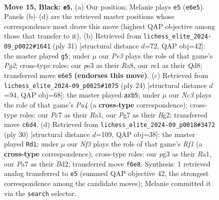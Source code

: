 \documentclass[11pt]{article}
\begin{document}
\begin{figure}[p]
\label{fig:thought-m27}
\end{figure}

\clearpage

\begin{figure}[p]\centering
\begin{subfigure}{0.46\textwidth}\centering
\resizebox{\linewidth}{!}{%
\newchessgame
\chessboard[
  setfen={1rbr2k1/p1p1qpp1/2n1pn2/2Pp3p/1p1P4/1Q2PNP1/PP1B1P1P/2K1RB1R b - - 1 15},
  showmover=false,
  pgfstyle=straightmove, color=movearrow, markmove={e6-e5}
]}
\caption{}
\end{subfigure}\hfill
\begin{subfigure}{0.46\textwidth}\centering
\resizebox{\linewidth}{!}{%
\newchessgame
\chessboard[
  setfen={r2qr1k1/1p1b1pp1/2pp1n1p/p4n2/P1P1pN2/1PP1P1PP/5PB1/R1BQ1RK1 b - - 1 16},
  showmover=false,
  pgfstyle=straightmove, color=movearrow, markmove={g7-g5}
]}
\caption{}
\end{subfigure}
\\[4pt]
\begin{subfigure}{0.46\textwidth}\centering
\resizebox{\linewidth}{!}{%
\newchessgame
\chessboard[
  setfen={1rbq1rk1/2p2pp1/p1n1pb1p/1p6/P1pP4/2N2NP1/1PQ1PPBP/R2R2K1 w - - 0 13},
  showmover=false,
  pgfstyle=straightmove, color=movearrow, markmove={a4-b5}
]}
\caption{}
\end{subfigure}\hfill
\begin{subfigure}{0.46\textwidth}\centering
\resizebox{\linewidth}{!}{%
\newchessgame
\chessboard[
  setfen={rn1qrbk1/2p2bpp/ppp2p2/P3p3/1PP1P3/3PNN2/3B1PPP/RQ3RK1 w - - 1 16},
  showmover=false,
  pgfstyle=straightmove, color=movearrow, markmove={f1-d1}
]}
\caption{}
\end{subfigure}
\caption{\textbf{Move 15, Black: \texttt{e5}.} (a) Our position; Melanie plays \texttt{e5} (\texttt{e6e5}). Panels (b)--(d) are the retrieved master positions whose correspondence most drove this move (highest QAP objective among those that transfer to it). (b) Retrieved from \texttt{lichess\_elite\_2024-09\_p0022\#1641} (ply 31) [structural distance $d$=72, QAP obj=42]: the master played \texttt{g5}; under $\mu$ our \emph{Pe3} plays the role of that game's \emph{Pg2}; cross-type roles: our \emph{p}e3 as their \emph{R}a8, our \emph{r}e1 as their \emph{Q}d8; transferred move \texttt{e6e5} \textbf{(endorses this move)}. (c) Retrieved from \texttt{lichess\_elite\_2024-09\_p0025\#1075} (ply 24) [structural distance $d$=94, QAP obj=68]: the master played \texttt{axb5}; under $\mu$ our \emph{Nc3} plays the role of that game's \emph{Pa4} (a \textbf{cross-type} correspondence); cross-type roles: our \emph{P}c7 as their \emph{R}a1, our \emph{P}g7 as their \emph{B}g2; transferred move \texttt{c6d4}. (d) Retrieved from \texttt{lichess\_elite\_2024-09\_p0018\#3472} (ply 30) [structural distance $d$=109, QAP obj=38]: the master played \texttt{Rd1}; under $\mu$ our \emph{Nf3} plays the role of that game's \emph{Rf1} (a \textbf{cross-type} correspondence); cross-type roles: our \emph{p}g3 as their \emph{R}a1, our \emph{P}a7 as their \emph{B}d2; transferred move \texttt{f6e8}. Synthesis: 1 retrieved analog transferred to \texttt{e5} (summed QAP objective 42, the strongest correspondence among the candidate moves); Melanie committed it via the \texttt{search} selector.}

\end{figure}
\end{document}

